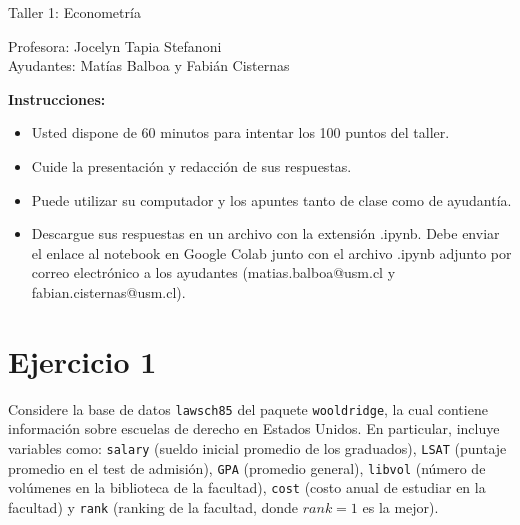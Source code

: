 \documentclass[letterpaper,11pt]{article}
\begin{document}
\begin{center}
    {\Large  Taller 1: Econometría }

Profesora:    Jocelyn Tapia Stefanoni\\
Ayudantes:   Matías Balboa y   Fabián Cisternas
\end{center}

\textbf{Instrucciones:} 

\begin{itemize}
    \item Usted dispone de 60 minutos  para intentar los 100 puntos del taller.
    \item Cuide la presentación y redacción de sus respuestas.
    \item Puede utilizar su computador y los apuntes tanto de clase como de ayudantía.
\item Descargue sus respuestas en un archivo con la extensión .ipynb. Debe enviar el enlace al notebook en Google Colab junto con el archivo .ipynb adjunto por correo electrónico a los ayudantes (matias.balboa@usm.cl y fabian.cisternas@usm.cl). 
    \end{itemize}
\section*{Ejercicio 1}

Considere la base de datos \texttt{lawsch85} del paquete \texttt{wooldridge}, la cual contiene información sobre escuelas de derecho en Estados Unidos. En particular, incluye variables como: 
\texttt{salary} (sueldo inicial promedio de los graduados), 
\texttt{LSAT} (puntaje promedio en el test de admisión), 
\texttt{GPA} (promedio general), 
\texttt{libvol} (número de volúmenes en la biblioteca de la facultad), 
\texttt{cost} (costo anual de estudiar en la facultad) y 
\texttt{rank} (ranking de la facultad, donde $rank=1$ es la mejor). 
\end{document}
